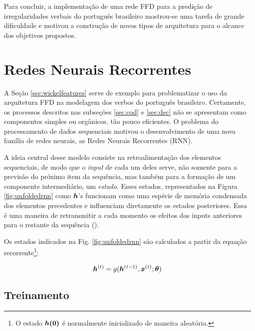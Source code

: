 Para concluir, a implementação de uma rede FFD para a predição de irregularidades verbais do português brasileiro mostrou-se uma tarefa de grande dificuldade e motivou a construção de novos tipos de arquitetura para o alcance dos objetivos propostos. 


\section{Redes Neurais Recorrentes}
\label{sec:RNN}

A Seção \ref{sec:wickelfeatures} serve de exemplo para problematizar o uso da arquitetura FFD na modelagem dos verbos do português brasileiro. Certamente, os processos descritos nas subseções \ref{sec:cod} e \ref{sec:dec} não se apresentam como componentes simples ou orgânicos, tão pouco eficientes. O problema do processamento de dados sequenciais motivou o desenvolvimento de uma nova família de redes neurais, as Redes Neurais Recorrentes (RNN). 

A ideia central desse modelo consiste na retroalimentação dos elementos sequenciais, de modo que o \textit{input} de cada um deles serve, não somente para a previsão do próximo item da sequência, mas também para a formação de um componente intermediário, um \textit{estado}. Esses estados, representados na Figura \ref{fig:unfoldedrnn} como $\bm{h}$'s funcionam como uma espécie de memória condensada dos elementos precedentes e influenciam diretamente os estados posteriores. Essa é uma maneira de retransmitir a cada momento os efeitos dos inputs anteriores para o restante da sequência (\cite{Goodfellow-et-al-2016}).

%


Os estados indicados na Fig. \ref{fig:unfoldedrnn} são calculados a partir da equação recorrente\footnote{O estado $\bm{h(0)}$ é normalmente inicializado de maneira aleatória.}:

\begin{equation}
\bm{h}^{(t)} = g(\bm{h}^{(t-1)}, \bm{x}^{(t)}; \bm{\theta})
\label{eq:rnn}
\end{equation}

\subsection{Treinamento}

